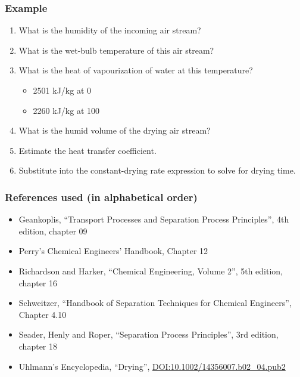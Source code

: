 \begin{frame}\frametitle{Example}
	\begin{enumerate}
		\item	What is the humidity of the incoming air stream? {\scriptsize \color{myOrange}{[0.04 kg water/kg dry air]}}
		\item	What is the wet-bulb temperature of this air stream? {\scriptsize \color{myOrange}{[$\sim$41.3\degC]}}
		\item	What is the heat of vapourization of water at this temperature? {\scriptsize \color{myOrange}{[2401 kJ/kg]}}
		\begin{itemize}
			\item	2501 kJ/kg at 0\degC
			\item	2260 kJ/kg at 100\degC
		\end{itemize}
		\item	What is the humid volume of the drying air stream? {\scriptsize \color{myOrange}{[$T=348$K, $v_H = 1.048 \text{m}^3\text{/kg}$]}}
		\item	Estimate the heat transfer coefficient.
		\item	Substitute into the constant-drying rate expression to solve for drying time.
	\end{enumerate}
\end{frame}

\begin{frame}\frametitle{References used (in alphabetical order)}
	\begin{itemize}
		\item	Geankoplis, ``Transport Processes and Separation Process Principles'', 4th edition, chapter 09
		\item	Perry's Chemical Engineers' Handbook, Chapter 12
		\item	Richardson and Harker, ``Chemical Engineering, Volume 2'', 5th edition, chapter 16	
		\item	Schweitzer, ``Handbook of Separation Techniques for Chemical Engineers'', Chapter 4.10
		\item	Seader, Henly and Roper, ``Separation Process Principles'', 3rd edition, chapter 18
		\item	Uhlmann's Encyclopedia, ``Drying'', {\tiny \href{http://dx.doi.org/10.1002/14356007.b02\_04.pub2}{DOI:10.1002/14356007.b02\_04.pub2}}
	\end{itemize}
\end{frame}